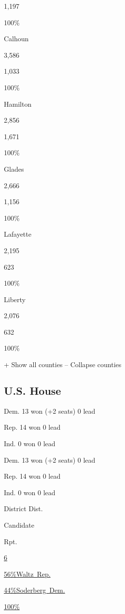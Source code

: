 1,197

100\%

Calhoun

3,586

1,033

100\%

Hamilton

2,856

1,671

100\%

Glades

2,666

1,156

100\%

Lafayette

2,195

623

100\%

Liberty

2,076

632

100\%

+ Show all counties -- Collapse counties

\hypertarget{us-house}{%
\subsection{U.S. House}\label{us-house}}

Dem. 13 won (+2 seats) 0 lead

Rep. 14 won 0 lead

Ind. 0 won 0 lead

Dem. 13 won (+2 seats) 0 lead

Rep. 14 won 0 lead

Ind. 0 won 0 lead

District Dist.

Candidate

Rpt.

\href{https://www.nytimes3xbfgragh.onion/elections/results/florida-house-district-6}{6}

\href{https://www.nytimes3xbfgragh.onion/elections/results/florida-house-district-6}{
56\%Waltz~Rep.}

\href{https://www.nytimes3xbfgragh.onion/elections/results/florida-house-district-6}{
44\%Soderberg~Dem.}

\href{https://www.nytimes3xbfgragh.onion/elections/results/florida-house-district-6}{100\%}

\href{https://www.nytimes3xbfgragh.onion/elections/results/florida-house-district-6}{}

